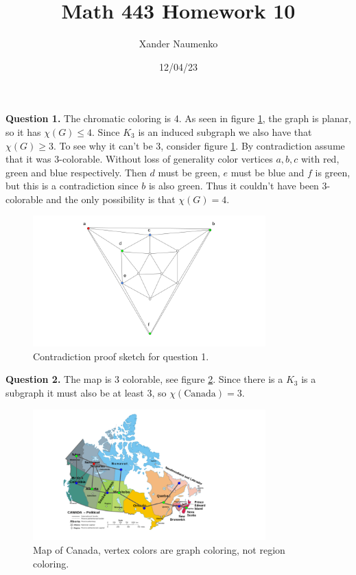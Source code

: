 \documentclass[letterpaper, reqno,11pt]{article}
\begin{document}
\title{Math 443 Homework 10}
\date{12/04/23}
\author{Xander Naumenko}
\maketitle

{\medskip\noindent\bf Question 1.} The chromatic coloring is 4. As seen in figure \ref{fig:1}, the graph is planar, so it has $\chi\left( G \right)\leq 4$. Since $K_3$ is an induced subgraph we also have that $\chi(G)\geq 3$. To see why it can't be 3, consider figure \ref{fig:1}. By contradiction assume that it was 3-colorable. Without loss of generality color vertices $a,b,c$ with red, green and blue respectively. Then $d$ must be green, $e$ must be blue and $f$ is green, but this is a contradiction since $b$ is also green. Thus it couldn't have been 3-colorable and the only possibility is that $\chi(G)=4$.

\begin{figure}[htpb]
    \centering
    \includegraphics[width=0.8\textwidth]{1}
    \caption{Contradiction proof sketch for question 1.}
    \label{fig:1}
\end{figure}

{\medskip\noindent\bf Question 2.} The map is 3 colorable, see figure \ref{fig:2}. Since there is a $K_3$ is a subgraph it must also be at least 3, so $\chi(\text{Canada})=3$.

\begin{figure}[htpb]
    \centering
    \includegraphics[width=0.8\textwidth]{2}
    \caption{Map of Canada, vertex colors are graph coloring, not region coloring.}
    \label{fig:2}
\end{figure}
\end{document}
